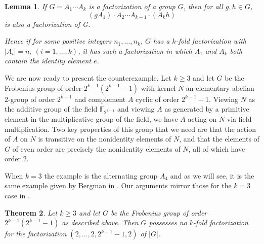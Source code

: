 \documentclass[10pt,a4paper]{amsart}
\newtheorem{theorem}{Theorem}[section]
\newtheorem{lemma}[theorem]{Lemma}
\begin{document}
\begin{lemma}\label{lem: e}
If $G = A_1 \cdots A_k$ is a factorization of a group $G$, then for all $g,h \in G$, $$(gA_1) \cdot A_2 \cdots A_{k-1} \cdot (A_k h)$$ is also a factorization of G.

Hence if for some positive integers $n_1, \dots, n_k$, $G$ has a $k$-fold factorization with $|A_i| = n_i$ $(i = 1, \dots, k)$, it has such a factorization in which $A_1$ and $A_k$ both contain the identity element $e$.
\end{lemma}

We are now ready to present the counterexample.  Let $k \geq 3$ and let $G$ be the Frobenius group of order $2^{k-1}(2^{k-1}-1)$ with kernel $N$ an elementary abelian $2$-group of order $2^{k-1}$ and complement $A$ cyclic of order $2^{k-1}-1$.  Viewing $N$ as the additive group of the field $\mathbb{F}_{2^{k-1}}$ and viewing $A$ as generated by a primitive element in the multiplicative group of the field, we have $A$ acting on $N$ via field multiplication.  Two key properties of this group that we need are that the action of $A$ on $N$ is transitive on the nonidentity elements of $N$, and that the elements of $G$ of even order are precisely the nonidentity elements of $N$, all of which have order $2$.

When $k=3$ the example is the alternating group $A_4$ and as we will see, it is the same example given by Bergman in \cite{berg}.  Our arguments mirror those for the $k=3$ case in \cite{berg}.

\begin{theorem}\label{thm1}
Let $k \geq 3$ and let $G$ be the Frobenius group of order $2^{k-1}(2^{k-1}-1)$ as described above.  Then $G$ possesses no $k$-fold factorization for the factorization $(2,\dots,2,2^{k-1}-1,2)$ of $|G|$.
\end{theorem}
\end{document}
